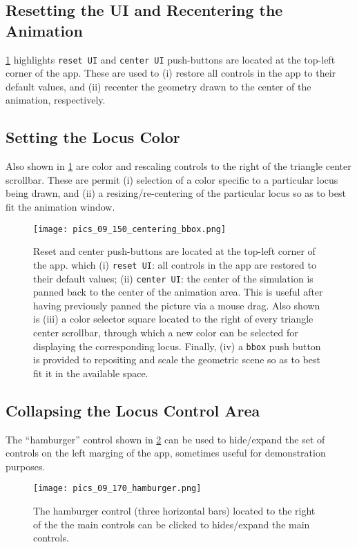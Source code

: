 \subsection{Resetting the UI and Recentering the Animation} 

\cref{fig:09-anim-appearance} highlights \texttt{reset UI} and \texttt{center UI} push-buttons are located at the top-left corner of the app. These are used to (i) restore all controls in the app to their default values, and (ii) recenter the geometry drawn to the center of the animation, respectively. 

\subsection{Setting the Locus Color}

Also shown in \cref{fig:09-anim-appearance} are color and rescaling controls to the right of the triangle center scrollbar. These are permit (i) selection of a color specific to a particular locus being drawn, and (ii) a resizing/re-centering of the particular locus so as to best fit the animation window.

\begin{figure}
    \centering
    \texttt{[image: pics\_09\_150\_centering\_bbox.png]}
    \caption{Reset and center push-buttons are located at the top-left corner of the app.  which (i) \texttt{reset UI}: all controls in the app are restored to their default values; (ii) \texttt{center UI}: the center of the simulation is panned back to the center of the animation area. This is useful after having previously panned the picture via a mouse drag. Also shown is (iii) a color selector square located to the right of every triangle center scrollbar, through which a new color can be selected for displaying the corresponding locus. Finally, (iv) a \texttt{bbox} push button is provided to repositing and scale the geometric scene so as to best fit it in the available space.}
    \label{fig:09-anim-appearance}
\end{figure}

\subsection{Collapsing the Locus Control Area}

The ``hamburger'' control shown in \cref{fig:09-hamburger} can be used to hide/expand the set of controls on the left marging of the app, sometimes useful for demonstration purposes.

\begin{figure}
    \centering
    \texttt{[image: pics\_09\_170\_hamburger.png]}
    \caption{The hamburger control (three horizontal bars) located to the right of the the main controls can be clicked to hides/expand the main controls.}
    \label{fig:09-hamburger}
\end{figure}